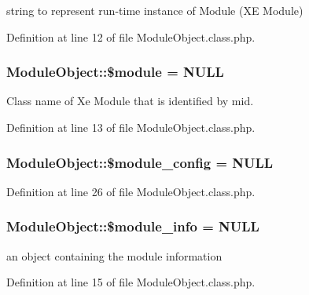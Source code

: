 string to represent run-\/time instance of Module (X\+E Module) 



Definition at line 12 of file Module\+Object.\+class.\+php.

\hypertarget{classModuleObject_a2809af79b38269089ba46bc922061ae8}{
\subsubsection[{\$module}]{\setlength{\rightskip}{0pt plus 5cm}Module\+Object\+::\$module = N\+U\+L\+L}}\label{classModuleObject_a2809af79b38269089ba46bc922061ae8}


Class name of Xe Module that is identified by mid. 



Definition at line 13 of file Module\+Object.\+class.\+php.

\hypertarget{classModuleObject_aed2cac16f365c2b463772e3eeb0c1402}{
\subsubsection[{\$module\+\_\+config}]{\setlength{\rightskip}{0pt plus 5cm}Module\+Object\+::\$module\+\_\+config = N\+U\+L\+L}}\label{classModuleObject_aed2cac16f365c2b463772e3eeb0c1402}


Definition at line 26 of file Module\+Object.\+class.\+php.

\hypertarget{classModuleObject_ac1c9807e77270f2e2abe4f79e1cd2987}{
\subsubsection[{\$module\+\_\+info}]{\setlength{\rightskip}{0pt plus 5cm}Module\+Object\+::\$module\+\_\+info = N\+U\+L\+L}}\label{classModuleObject_ac1c9807e77270f2e2abe4f79e1cd2987}


an object containing the module information 



Definition at line 15 of file Module\+Object.\+class.\+php.

